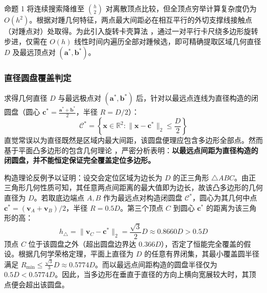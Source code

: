 \documentclass[zihao=-4,a4paper,UTF8]{ctexart}
\begin{document}
命题 1 将连续搜索降维至 $\binom{h}{2}$ 对离散顶点比较，但全顶点穷举计算复杂度仍为 $O(h^2)$。根据对踵几何特征，两点最大间距必在相互平行的外切支撑线接触点（对踵点对）处取得。为此引入旋转卡壳算法 \cite{toussaint1983}，通过一对平行卡尺绕多边形旋转步进，仅需在 $O(h)$ 线性时间内遍历全部对踵候选，即可精确提取区域几何直径 $D$ 及最远顶点对 $(\mathbf{a}^*, \mathbf{b}^*)$。

\subsubsection{直径圆盘覆盖判定}

求得几何直径 $D$ 与最远极点对 $(\mathbf{a}^*, \mathbf{b}^*)$ 后，针对以最远点连线为直径构造的闭圆盘（圆心 $\mathbf{c}^* = \frac{\mathbf{a}^* + \mathbf{b}^*}{2}$，半径 $R = D/2$）：
\begin{equation}
    \mathcal{C}^* = \left\{ \mathbf{x} \in \mathbb{R}^2 : \|\mathbf{x} - \mathbf{c}^*\|_2 \le \frac{D}{2} \right\}
\end{equation}
直觉常误以为直径既然是区域内最大间距，该圆盘便理应包含多边形全部点。然而基于平面凸多边形的包含几何理论 \cite{welzl1991}，严密分析表明：\textbf{以最远点间距为直径构造的闭圆盘，并不能恒定保证完全覆盖定位多边形。}

构造理论反例予以证明：设交会定位区域为边长为 $D$ 的正三角形 $\triangle ABC$。由正三角形几何性质可知，其任意两点间距离的最大值即为边长，故该凸多边形的几何直径为 $D$。若取底边端点 $A, B$ 作为最远点对构造闭圆盘 $\mathcal{C}^*$，圆心为其几何中点 $\mathbf{c}^* = (\mathbf{v}_A + \mathbf{v}_B)/2$，半径 $R = 0.5D$。第三个顶点 $C$ 到圆心 $\mathbf{c}^*$ 的距离为该三角形的高：
\begin{equation}
    h_{\triangle} = \|\mathbf{v}_C - \mathbf{c}^*\|_2 = \frac{\sqrt{3}}{2} D \approx 0.8660 D > 0.5 D
\end{equation}
顶点 $C$ 位于该圆盘之外（超出圆盘边界达 $0.366D$），否定了恒能完全覆盖的假设。根据几何学荣格定理，平面上直径为 $D$ 的任意有界闭集，其最小覆盖圆半径满足 $R_{\min} \le \frac{\sqrt{3}}{3} D \approx 0.5774 D$。而以最远点间距构造的圆盘半径仅为 $0.5D < 0.5774D$。因此，当多边形在垂直于直径的方向上横向宽展较大时，其顶点便会超出该圆盘。
\end{document}
